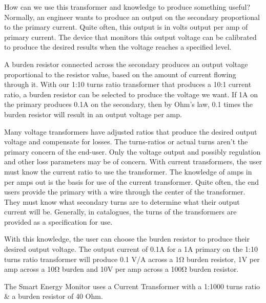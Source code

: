 {How can we use this transformer and knowledge to produce something useful? Normally, an engineer wants to produce an output on the secondary proportional to the primary current. Quite often, this output is in volts output per amp of primary current. The device that monitors this output voltage can be calibrated to produce the desired results when the voltage reaches a specified level.

A burden resistor connected across the secondary produces an output voltage proportional to the resistor value, based on the amount of current flowing through it. With our 1:10 turns ratio transformer that produces a 10:1 current ratio, a burden resistor can be selected to produce the voltage we want. If 1A on the primary produces 0.1A on the secondary, then by Ohm's law, 0.1 times the burden resistor will result in an output voltage per amp.

Many voltage transformers have adjusted ratios that produce the desired output voltage and compensate for losses. The turns-ratios or actual turns aren't the primary concern of the end-user. Only the voltage output and possibly regulation and other loss parameters may be of concern. With current transformers, the user must know the current ratio to use the transformer. The knowledge of amps in per amps out is the basis for use of the current transformer. Quite often, the end users provide the primary with a wire through the center of the transformer. They must know what secondary turns are to determine what their output current will be. Generally, in catalogues, the turns of the transformers are provided as a specification for use.

With this knowledge, the user can choose the burden resistor to produce their desired output voltage. The output current of 0.1A for a 1A primary on the 1:10 turns ratio transformer will produce 0.1 V/A across a 1Ω burden resistor, 1V per amp across a 10Ω burden and 10V per amp across a 100Ω burden resistor.

The Smart Energy Monitor uses a Current Transformer with a 1:1000 turns ratio & a burden resistor of 40 Ohm.
}

